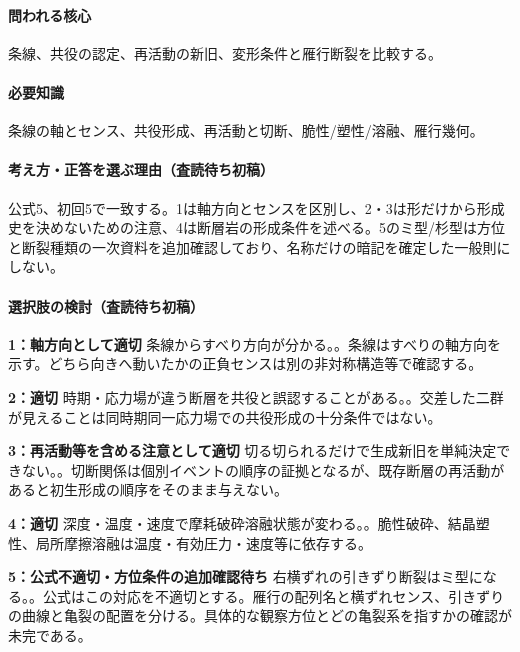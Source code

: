 \paragraph{問われる核心} 条線、共役の認定、再活動の新旧、変形条件と雁行断裂を比較する。

\paragraph{必要知識} 条線の軸とセンス、共役形成、再活動と切断、脆性/塑性/溶融、雁行幾何。

\paragraph{考え方・正答を選ぶ理由（査読待ち初稿）} 公式5、初回5で一致する。1は軸方向とセンスを区別し、2・3は形だけから形成史を決めないための注意、4は断層岩の形成条件を述べる。5のミ型/杉型は方位と断裂種類の一次資料を追加確認しており、名称だけの暗記を確定した一般則にしない。

\paragraph{選択肢の検討（査読待ち初稿）}\mbox{}\par

\noindent\textbf{1：軸方向として適切} 条線からすべり方向が分かる。。条線はすべりの軸方向を示す。どちら向きへ動いたかの正負センスは別の非対称構造等で確認する。\par

\noindent\textbf{2：適切} 時期・応力場が違う断層を共役と誤認することがある。。交差した二群が見えることは同時期同一応力場での共役形成の十分条件ではない。\par

\noindent\textbf{3：再活動等を含める注意として適切} 切る切られるだけで生成新旧を単純決定できない。。切断関係は個別イベントの順序の証拠となるが、既存断層の再活動があると初生形成の順序をそのまま与えない。\par

\noindent\textbf{4：適切} 深度・温度・速度で摩耗破砕溶融状態が変わる。。脆性破砕、結晶塑性、局所摩擦溶融は温度・有効圧力・速度等に依存する。\par

\noindent\textbf{5：公式不適切・方位条件の追加確認待ち} 右横ずれの引きずり断裂はミ型になる。。公式はこの対応を不適切とする。雁行の配列名と横ずれセンス、引きずりの曲線と亀裂の配置を分ける。具体的な観察方位とどの亀裂系を指すかの確認が未完である。\par

